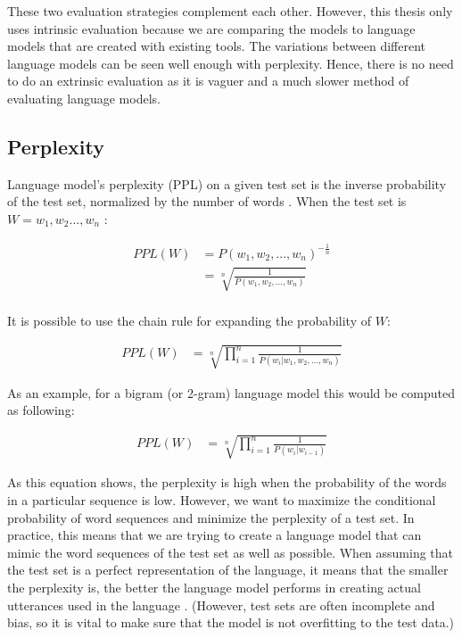 These two evaluation strategies complement each other. However, this thesis only uses intrinsic evaluation because we are comparing the models to language models that are created with existing tools. The variations between different language models can be seen well enough with perplexity. Hence, there is no need to do an extrinsic evaluation as it is vaguer and a much slower method of evaluating language models.


\subsection{Perplexity}

Language model’s perplexity (PPL) on a given test set is the inverse probability of the test set, normalized by the number of words \parencite{jurafsky2014speech}. When the test set is $W = {w_1, w_2 . . . , w_n}$ : 

\begin{equation}
    \begin{aligned}
    PPL(W) &= P(w_1, w_2, . . . , w_n)^{-\frac{1}{n}} \\
    &=\sqrt[n]{\frac{1}{P(w_1, w_2, . . . , w_n)}} \\
    \end{aligned}
\end{equation}

It is possible to use the chain rule for expanding the probability of $W$:

\begin{equation}
    \begin{aligned}
    PPL(W) &=\sqrt[n]{\prod_{i=1}^{n} \frac{1}{P(w_i | w_1, w_2, . . . , w_n)}}
    \end{aligned}
\end{equation}

As an example, for a bigram (or 2-gram) language model this would be computed as following:

\begin{equation}
    \begin{aligned}
    PPL(W) &=\sqrt[n]{\prod_{i=1}^{n} \frac{1}{P(w_i | w_{i-1})}}
    \end{aligned}
\end{equation}

As this equation shows, the perplexity is high when the probability of the words in a particular sequence is low. However, we want to maximize the conditional probability of word sequences and minimize the perplexity of a test set. In practice, this means that we are trying to create a language model that can mimic the word sequences of the test set as well as possible. When assuming that the test set is a perfect representation of the language, it means that the smaller the perplexity is, the better the language model performs in creating actual utterances used in the language \parencite{jurafsky2014speech}. (However, test sets are often incomplete and bias, so it is vital to make sure that the model is not overfitting to the test data.)

